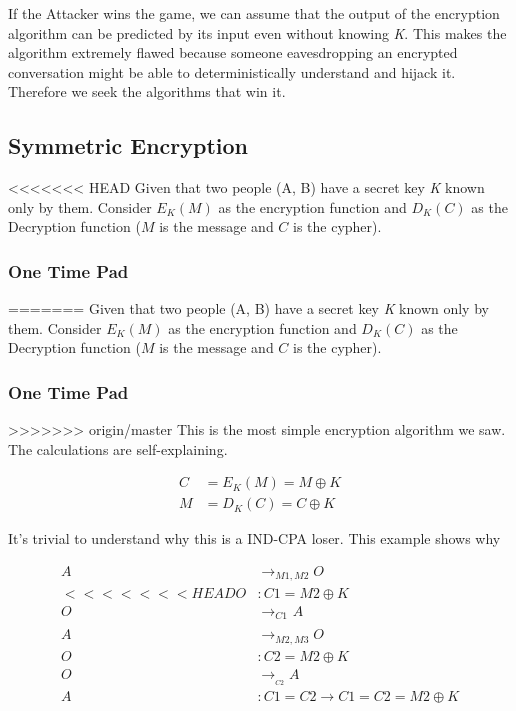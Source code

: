 \documentclass[11pt]{article}
\begin{document}
If the Attacker wins the game, we can assume that the output of the encryption algorithm can be predicted by its input even without knowing \emph{K}. This makes the algorithm extremely flawed because someone eavesdropping an encrypted conversation might be able to deterministically understand and hijack it. Therefore we seek the algorithms that win it.  
\subsection{Symmetric Encryption}
<<<<<<< HEAD
\label{sec:orgad47327}
Given that two people (A, B) have a secret key \emph{K} known only by them. Consider \(E_K(M)\) as the encryption function and \(D_K(C)\) as the Decryption function (\(M\) is the message and \(C\) is the cypher).\cite{symEnc,SymEncSlide}   
\subsubsection{One Time Pad}
\label{sec:orgf7b8525}
=======
\label{sec:org9cd5d12}
Given that two people (A, B) have a secret key \emph{K} known only by them. Consider \(E_K(M)\) as the encryption function and \(D_K(C)\) as the Decryption function (\(M\) is the message and \(C\) is the cypher).\cite{symEnc,SymEncSlide}   
\subsubsection{One Time Pad}
\label{sec:org39c8a7c}
>>>>>>> origin/master
This is the most simple encryption algorithm we saw. The calculations are self-explaining.

\begin{align*}
C &= E_K(M) = M \oplus K \\
M &= D_K(C) = C \oplus K
\end{align*}

It's trivial to understand why this is a IND-CPA loser. This example shows why

\begin{align}
A &\to_{M1,M2} O \\
<<<<<<< HEAD
O &: C1 = M2 \oplus K \\
O &\to_{C1}_{}_{} A \\
A &\to_{M2,M3} O \\
O &: C2 = M2 \oplus K \\
O &\to_{}_{C2} A \\
A &: C1 = C2 \to C1 = C2 = M2 \oplus K
\end{align}
\end{document}
